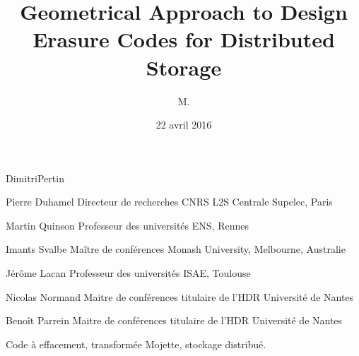 

\title{Geometrical Approach to Design Erasure Codes for Distributed Storage}

\author{M.}{Dimitri}{Pertin}






\thesisnumber{}

\date{22 avril 2016}

    {Pierre}
    {Duhamel}
    {Directeur de recherches CNRS}
    {L2S Centrale Supelec, Paris}

    {Martin}
    {Quinson}
    {Professeur des universités}
    {ENS, Rennes}

    {Imants}
    {Svalbe}
    {Maître de conférences}
    {Monash University, Melbourne, Australie}

    {Jérôme}
    {Lacan}
    {Professeur des universités}
    {ISAE, Toulouse}

    {Nicolas}
    {Normand}
    {Maitre de conférences titulaire de l'HDR}
    {Université de Nantes}
 
    {Benoît}
    {Parrein}
    {Maitre de conférences titulaire de l'HDR}
    {Université de Nantes}   



\begin{resume}
    \footnotesize
    
\end{resume}

\begin{motscles}
    Code à effacement, transformée Mojette, stockage distribué.
\end{motscles}

\begin{abstract}
    \footnotesize
    
\end{abstract}

